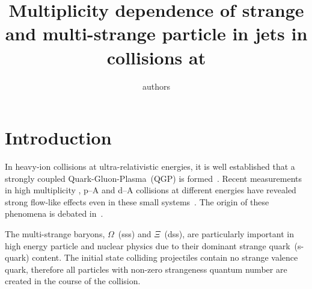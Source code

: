 \documentclass[ALICE,manyauthors]{StrinJet}
\begin{document}
\title{Multiplicity dependence of strange and multi-strange particle in jets in \pp collisions at \seven}
\author{authors}
\begin{abstract}
	\label{sec:Abs}
	
\end{abstract}


\setcounter{page}{1}


\clearpage
\section{Introduction}
\label{sec:intro}
In heavy-ion collisions at ultra-relativistic energies, it is well established that a strongly coupled Quark-Gluon-Plasma~(QGP) is formed~\cite{Adams:2005dq, Adcox:2004mh, Arsene:2004fa, Back:2004je, Schukraft:2011na}.
Recent measurements in high multiplicity \pp, p--A and d--A collisions at different energies have revealed strong flow-like effects even in these small systems~\cite{Abelev:2012sk, Chatrchyan:2013eya, Khachatryan:2010gv, CMS:2012qk, Abelev:2012ola, Aad:2012gla, Aad:2013fja, Chatrchyan:2013nka, Adare:2013esx, Adams:2006nd}.
The origin of these phenomena is debated in~\cite{Shuryak:2013ke, Werner:2013ipa, Bozek:2013ska, Dumitru:2010iy, Schenke:2015aqa, Ma:2014pva, Ortiz:2013yxa}.

The multi-strange baryons, $\Omega$~(sss) and $\Xi$~(dss), are particularly important in high energy particle and nuclear physics due to their dominant strange quark~(s-quark) content. The initial state colliding projectiles contain no strange valence quark, therefore all particles with non-zero strangeness quantum number are created in the course of the collision.


\newenvironment{acknowledgement}{\relax}{\relax}
%





\newpage
\appendix
 
\end{document}
